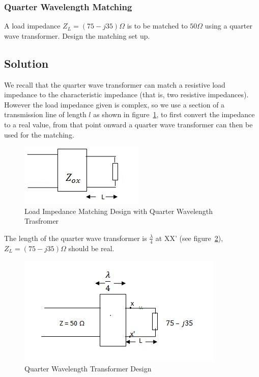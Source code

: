 \begin{exmp}
\subsubsection*{Quarter Wavelength Matching}
A load impedance $Z_{L}=(75-j35)\varOmega$ is to be matched to $50\varOmega$ using a quarter wave transformer. Design the matching set up. 

\subsection*{Solution}
We recall that the quarter wave transformer can match a resistive load impedance to the characteristic impedance (that is, two resistive impedances). However the load impedance given is complex, so we use a section of a transmission line of length $l$ as shown in figure~\ref{fig;fighalfwave}, to first convert the impedance to a real value, from that point onward a quarter wave transformer can then be used for the matching.
\begin{figure}[h]
\centering
\includegraphics[width=0.7\linewidth]{./graphics/fighalfwave}
\caption{Load Impedance Matching Design with Quarter Wavelength Trasfromer}
\label{fig;fighalfwave}
\end{figure}

The length of the quarter wave transformer is $\frac{\lambda}{4}$ at XX' (see figure~\ref{fig:image}), $Z_L = (75-j35)\varOmega$ should be real.
\begin{figure}[h]
\centering
\includegraphics[width=1\linewidth]{./graphics/image}
\caption{Quarter Wavelength Transformer Design}
\label{fig:image}
\end{figure}


\end{exmp}
